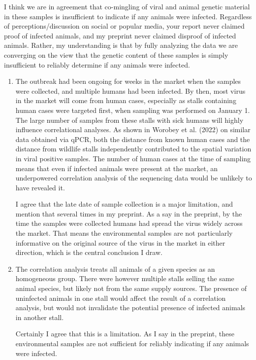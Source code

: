 \documentclass[9pt,twocolumn,twoside]{gsajnl_modified}
\begin{document}
\begin{enumerate}
{I think we are in agreement that co-mingling of viral and animal genetic material in these samples is insufficient to indicate if any animals were infected.
Regardless of perceptions/discussion on social or popular media, your report never claimed proof of infected animals, and my preprint never claimed disproof of infected animals.
Rather, my understanding is that by fully analyzing the data we are converging on the view that the genetic content of these samples is simply insufficient to reliably determine if any animals were infected.
}

\begin{enumerate}[label=\alph*)]

\item The outbreak had been ongoing for weeks in the market when the samples were collected, and multiple humans had been infected. By then, most virus in the market will come from human cases, especially as stalls containing human cases were targeted first, when sampling was performed on January 1. The large number of samples from these stalls with sick humans will highly influence correlational analyses. As shown in Worobey et al. (2022) on similar data obtained via qPCR, both the distance from known human cases and the distance from wildlife stalls independently contributed to the spatial variation in viral positive samples. The number of human cases at the time of sampling means that even if infected animals were present at the market, an underpowered correlation analysis of the sequencing data would be unlikely to have revealed it.

{\color{black} I agree that the late date of sample collection is a major limitation, and mention that several times in my preprint. As a say in the preprint, by the time the samples were collected humans had spread the virus widely across the market. That means the environmental samples are not particularly informative on the original source of the virus in the market in either direction, which is the central conclusion I draw.}

\item The correlation analysis treats all animals of a given species as an homogeneous group. There were however multiple stalls selling the same animal species, but likely not from the same supply sources. The presence of uninfected animals in one stall would affect the result of a correlation analysis, but would not invalidate the potential presence of infected animals in another stall.

{\color{black} Certainly I agree that this is a limitation. As I say in the preprint, these environmental samples are not sufficient for reliably indicating if any animals were infected.}


\end{enumerate}
\end{enumerate}
\end{document}
